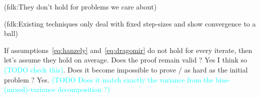 \documentclass[twoside]{article}
\let\oldsection\section
\renewcommand{\section}[1]{\oldsection{\texorpdfstring{\uppercase{#1}}{#1}}}
\newcommand{\fdk}[1]{\textcolor{Periwinkle}{(fdk:#1)}}
\newcommand{\TODO}[1]{\textcolor{cyan}{(TODO #1)}}
\begin{document}
\fdk{They don't hold for problems we care about}

\fdk{Existing techniques only deal with fixed step-sizes and show convergence to a ball}

If assumptions~\eqref{eq:hanzely} and~\eqref{eq:dragomir} do not hold for every iterate, then let's assume they hold on average. Does the proof remain valid ? Yes I think so \TODO{check this}. Does it become impossible to prove / as hard as the initial problem ? Yes.
\TODO{Does it match exactly the variance from the bias-(mixed)-variance decomposition ?}


\end{document}
